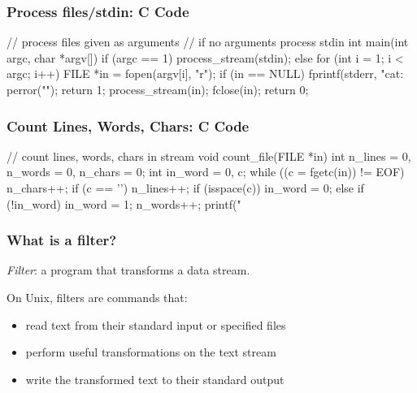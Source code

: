 \begin{frame}[fragile]
\frametitle{Process files/stdin: C Code}
\begin{small}
\begin{C}
// process files given as arguments
// if no arguments process stdin
int main(int argc, char *argv[]) {
    if (argc == 1)
        process_stream(stdin);
    else
        for (int i = 1; i < argc; i++) {
            FILE *in = fopen(argv[i], "r");
            if (in == NULL) {
                fprintf(stderr, "cat: %
                perror("");
                return 1;
            }
            process_stream(in);
            fclose(in);
        }
    return 0;
}
\end{C}
\end{small}
\end{frame}

\begin{frame}[fragile]
\frametitle{Count Lines, Words, Chars: C Code}
\begin{C}
// count lines, words, chars in stream 
void count_file(FILE *in) {
    int n_lines = 0, n_words = 0, n_chars = 0;
    int in_word = 0, c;
    while ((c = fgetc(in)) != EOF) {
        n_chars++;
        if (c == '\n')
            n_lines++;
        if (isspace(c))
            in_word = 0;
        else if (!in_word) {
            in_word = 1;
            n_words++;
        }
    }
    printf("%
}
\end{C}
\end{frame}

\begin{frame}
\frametitle{What is a filter?}
{\em{Filter}}: a program that transforms a data stream.

On Unix, filters are commands that:
\begin{itemize}
\item  read text from their standard input or specified files
\item  perform useful transformations on the text stream
\item  write the transformed text to their standard output
\end{itemize}
\end{frame}

